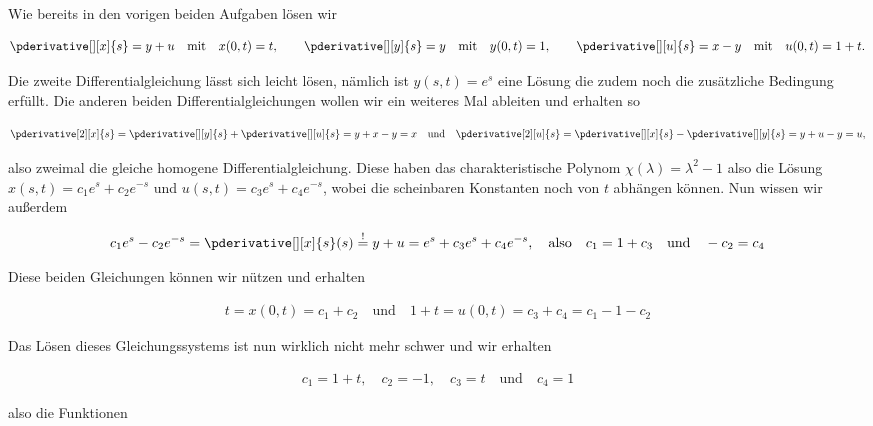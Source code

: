 \begin{solution}

Wie bereits in den vorigen beiden Aufgaben lösen wir

\begin{align*}
    \pderivative[][x]{s} = y + u \quad \text{mit} \quad x(0,t) = t, \qquad
    \pderivative[][y]{s} = y \quad \text{mit} \quad y(0,t) = 1, \qquad
    \pderivative[][u]{s} = x - y \quad \text{mit} \quad u(0,t) = 1 + t .
\end{align*}

Die zweite Differentialgleichung lässt sich leicht lösen, nämlich ist $y(s,t) = e^s$ eine Lösung die zudem noch die zusätzliche Bedingung erfüllt. Die anderen beiden Differentialgleichungen wollen wir ein weiteres Mal ableiten und erhalten so

\begin{align*}
    \pderivative[2][x]{s} = \pderivative[][y]{s} + \pderivative[][u]{s} = y  + x - y = x \quad \text{und} \quad \pderivative[2][u]{s} = \pderivative[][x]{s} - \pderivative[][y]{s} = y + u - y = u,
\end{align*}

also zweimal die gleiche homogene Differentialgleichung. Diese haben das charakteristische Polynom $\chi(\lambda) = \lambda^2 -1$ also die Lösung $x(s,t) = c_1 e^s + c_2 e^{-s}$ und $u(s,t) = c_3 e^s + c_4 e^{-s}$, wobei die scheinbaren Konstanten noch von $t$ abhängen können. Nun wissen wir außerdem

\begin{align*}
    c_1 e^s - c_2 e^{-s} = \pderivative[][x]{s}(s)\stackrel{!}{=} y + u = e^s + c_3 e^s + c_4 e^{-s}, \quad \text{also} \quad c_1 = 1 + c_3 \quad \text{und} \quad -c_2 = c_4
\end{align*}

Diese beiden Gleichungen können wir nützen und erhalten

\begin{align*}
    t = x(0,t) = c_1 + c_2 \quad \text{und} \quad 1 + t = u(0,t) = c_3 + c_4 = c_1 - 1 - c_2
\end{align*}

Das Lösen dieses Gleichungssystems ist nun wirklich nicht mehr schwer und wir erhalten

\begin{align*}
    c_1 = 1 + t, \quad c_2 = -1, \quad c_3 = t \quad \text{und} \quad c_4 = 1
\end{align*}

also die Funktionen


\end{solution}

